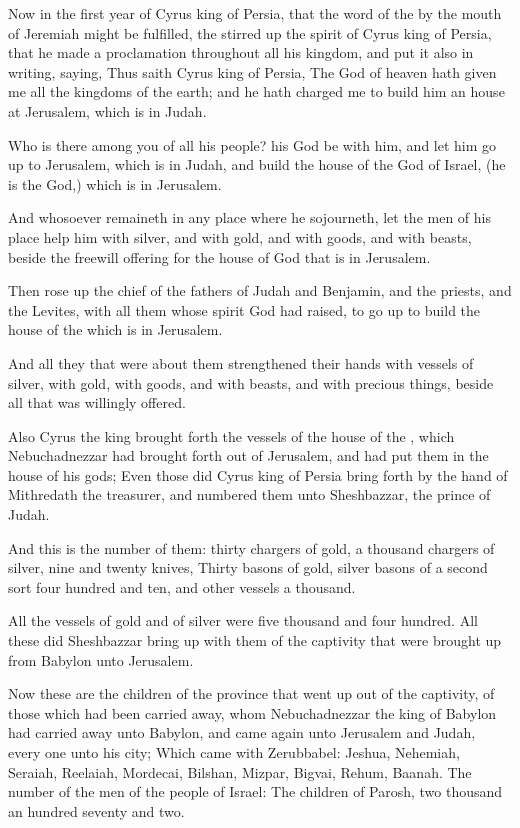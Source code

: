 \Chapter
\Verse Now in the first year of Cyrus king of Persia, that the word of the \LORD by the mouth of Jeremiah might be fulfilled, the \LORD stirred up the spirit of Cyrus king of Persia, that he made a proclamation throughout all his kingdom, and put it also in writing, saying, \Verse Thus saith Cyrus king of Persia, The \LORD God of heaven hath given me all the kingdoms of the earth; and he hath charged me to build him an house at Jerusalem, which is in Judah.

\Verse Who is there among you of all his people? his God be with him, and let him go up to Jerusalem, which is in Judah, and build the house of the \LORD God of Israel, (he is the God,) which is in Jerusalem.

\Verse And whosoever remaineth in any place where he sojourneth, let the men of his place help him with silver, and with gold, and with goods, and with beasts, beside the freewill offering for the house of God that is in Jerusalem.

\Verse Then rose up the chief of the fathers of Judah and Benjamin, and the priests, and the Levites, with all them whose spirit God had raised, to go up to build the house of the \LORD which is in Jerusalem.

\Verse And all they that were about them strengthened their hands with vessels of silver, with gold, with goods, and with beasts, and with precious things, beside all that was willingly offered.

\Verse Also Cyrus the king brought forth the vessels of the house of the \LORD, which Nebuchadnezzar had brought forth out of Jerusalem, and had put them in the house of his gods; \Verse Even those did Cyrus king of Persia bring forth by the hand of Mithredath the treasurer, and numbered them unto Sheshbazzar, the prince of Judah.

\Verse And this is the number of them: thirty chargers of gold, a thousand chargers of silver, nine and twenty knives, \Verse Thirty basons of gold, silver basons of a second sort four hundred and ten, and other vessels a thousand.

\Verse All the vessels of gold and of silver were five thousand and four hundred. All these did Sheshbazzar bring up with them of the captivity that were brought up from Babylon unto Jerusalem.


\Chapter
\Verse Now these are the children of the province that went up out of the captivity, of those which had been carried away, whom Nebuchadnezzar the king of Babylon had carried away unto Babylon, and came again unto Jerusalem and Judah, every one unto his city; \Verse Which came with Zerubbabel: Jeshua, Nehemiah, Seraiah, Reelaiah, Mordecai, Bilshan, Mizpar, Bigvai, Rehum, Baanah. The number of the men of the people of Israel: \Verse The children of Parosh, two thousand an hundred seventy and two.

